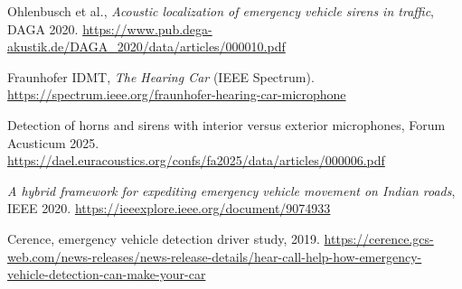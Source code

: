 \documentclass[11pt]{article}
\begin{document}
{\begin{description}[leftmargin=1.2cm,style=nextline,itemsep=2pt]
\item[R24] Ohlenbusch et al., \emph{Acoustic localization of emergency vehicle sirens in traffic}, DAGA 2020. \url{https://www.pub.dega-akustik.de/DAGA_2020/data/articles/000010.pdf}
\item[R25] Fraunhofer IDMT, \emph{The Hearing Car} (IEEE Spectrum). \url{https://spectrum.ieee.org/fraunhofer-hearing-car-microphone}
\item[R26] Detection of horns and sirens with interior versus exterior microphones, Forum Acusticum 2025. \url{https://dael.euracoustics.org/confs/fa2025/data/articles/000006.pdf}
\item[R27] \emph{A hybrid framework for expediting emergency vehicle movement on Indian roads}, IEEE 2020. \url{https://ieeexplore.ieee.org/document/9074933}
\item[R28] Cerence, emergency vehicle detection driver study, 2019. \url{https://cerence.gcs-web.com/news-releases/news-release-details/hear-call-help-how-emergency-vehicle-detection-can-make-your-car}
\end{description}}
\end{document}

